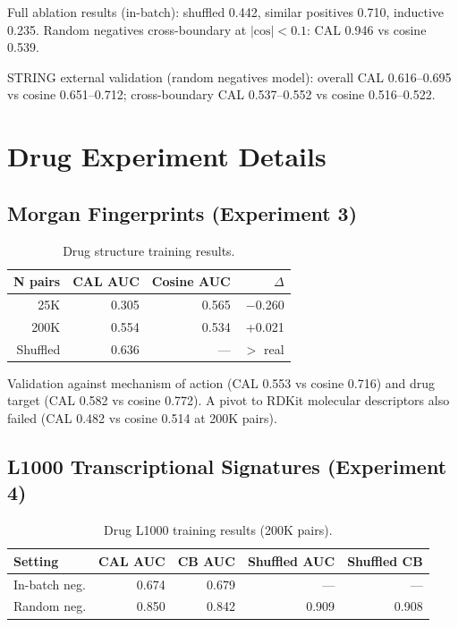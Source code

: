 \documentclass[11pt]{article}
\begin{document}
Full ablation results (in-batch): shuffled 0.442, similar positives 0.710, inductive 0.235. Random negatives cross-boundary at $|\text{cos}| < 0.1$: CAL 0.946 vs cosine 0.539.

STRING external validation (random negatives model): overall CAL 0.616--0.695 vs cosine 0.651--0.712; cross-boundary CAL 0.537--0.552 vs cosine 0.516--0.522.

\section{Drug Experiment Details}
\label{app:drugs}

\subsection{Morgan Fingerprints (Experiment 3)}

\begin{table}[h]
\centering
\caption{Drug structure training results.}
\label{tab:drug_morgan}
\begin{tabular}{rrrr}
\toprule
N pairs & CAL AUC & Cosine AUC & $\Delta$ \\
\midrule
25K & 0.305 & 0.565 & $-$0.260 \\
200K & 0.554 & 0.534 & +0.021 \\
Shuffled & 0.636 & --- & $>$ real \\
\bottomrule
\end{tabular}
\end{table}

Validation against mechanism of action (CAL 0.553 vs cosine 0.716) and drug target (CAL 0.582 vs cosine 0.772). A pivot to RDKit molecular descriptors also failed (CAL 0.482 vs cosine 0.514 at 200K pairs).

\subsection{L1000 Transcriptional Signatures (Experiment 4)}

\begin{table}[h]
\centering
\caption{Drug L1000 training results (200K pairs).}
\label{tab:drug_l1000}
\begin{tabular}{lrrrr}
\toprule
Setting & CAL AUC & CB AUC & Shuffled AUC & Shuffled CB \\
\midrule
In-batch neg. & 0.674 & 0.679 & --- & --- \\
Random neg. & 0.850 & 0.842 & 0.909 & 0.908 \\
\bottomrule
\end{tabular}
\end{table}
\end{document}
